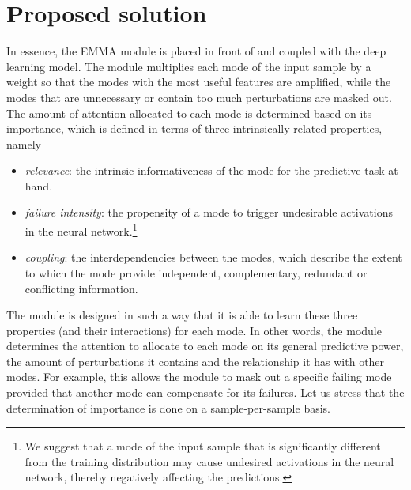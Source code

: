 
\section{Proposed solution}\label{sec:proposed-solution}
In essence, the EMMA module is placed in front of and coupled with the deep learning model. The module multiplies each mode of the input sample by a weight so that the modes with the most useful features are amplified, while the modes that are unnecessary or contain too much perturbations are masked out. The amount of attention allocated to each mode is determined based on its importance, which is defined in terms of three intrinsically related properties, namely
\begin{itemize}
\item \textit{relevance}: the intrinsic informativeness of the mode for the predictive task at hand.
\item \textit{failure intensity}: the propensity of a mode to trigger undesirable activations in the neural network.\footnote{We suggest that a mode of the input sample that is significantly different from the training distribution may cause undesired activations in the neural network, thereby negatively affecting the predictions.}
\item \textit{coupling}: the interdependencies between the modes, which describe the extent to which the mode provide independent, complementary, redundant or conflicting information.
\end{itemize}
The module is designed in such a way that it is able to learn these three properties (and their interactions) for each mode. In other words, the module determines the attention to allocate to each mode on its general predictive power, the amount of perturbations it contains and the relationship it has with other modes. For example, this allows the module to mask out a specific failing mode provided that another mode can compensate for its failures. Let us stress that the determination of importance is done on a sample-per-sample basis.
